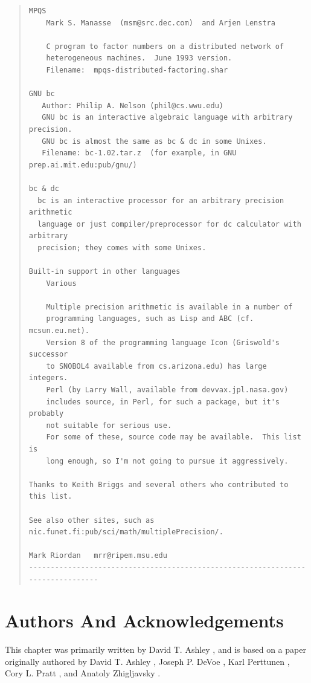 \begin{quote}
\begin{scriptsize}
\begin{verbatim}
MPQS
    Mark S. Manasse  (msm@src.dec.com)  and Arjen Lenstra

    C program to factor numbers on a distributed network of
    heterogeneous machines.  June 1993 version.
    Filename:  mpqs-distributed-factoring.shar

GNU bc
   Author: Philip A. Nelson (phil@cs.wwu.edu)
   GNU bc is an interactive algebraic language with arbitrary precision.
   GNU bc is almost the same as bc & dc in some Unixes.
   Filename: bc-1.02.tar.z  (for example, in GNU prep.ai.mit.edu:pub/gnu/)

bc & dc
  bc is an interactive processor for an arbitrary precision arithmetic
  language or just compiler/preprocessor for dc calculator with arbitrary
  precision; they comes with some Unixes.

Built-in support in other languages
    Various

    Multiple precision arithmetic is available in a number of 
    programming languages, such as Lisp and ABC (cf. mcsun.eu.net).
    Version 8 of the programming language Icon (Griswold's successor
    to SNOBOL4 available from cs.arizona.edu) has large integers.
    Perl (by Larry Wall, available from devvax.jpl.nasa.gov)
    includes source, in Perl, for such a package, but it's probably
    not suitable for serious use.
    For some of these, source code may be available.  This list is
    long enough, so I'm not going to pursue it aggressively.

Thanks to Keith Briggs and several others who contributed to this list.

See also other sites, such as nic.funet.fi:pub/sci/math/multiplePrecision/.

Mark Riordan   mrr@ripem.msu.edu
--------------------------------------------------------------------------------
\end{verbatim}
\end{scriptsize}
\end{quote}



\section{Authors And Acknowledgements}
This chapter was primarily written by David T. Ashley
\cite{bibref:i:daveashley}, and is based on a paper originally
authored by 
David T. Ashley \cite{bibref:i:daveashley}, 
Joseph P. DeVoe \cite{bibref:i:joedevoe},
Karl Perttunen \cite{bibref:i:karlperttunen},
Cory L. Pratt \cite{bibref:i:corypratt},
and Anatoly Zhigljavsky \cite{bibref:i:anatolyzhigljavsky}.

